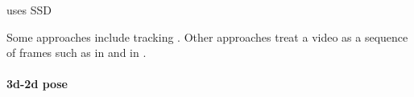 \documentclass{report}
\begin{document}
\cite{DBLP:journals/corr/SinghSC16} uses SSD 

Some approaches include tracking \cite{DBLP:journals/corr/WeinzaepfelHS15}.
Other approaches treat a video as a sequence of frames such as in \cite{DBLP:journals/corr/KalogeitonWFS17} and in \cite{DBLP:journals/corr/HouCS17}.

\paragraph{3d-2d pose}










\end{document}
